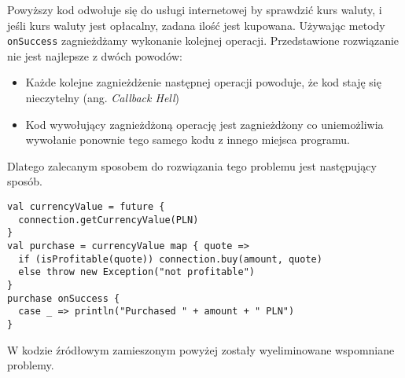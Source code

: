 Powyższy kod odwołuje się do usługi internetowej by sprawdzić kurs waluty, i jeśli kurs waluty jest opłacalny, zadana ilość jest kupowana.
Używając metody \lstinline{onSuccess} zagnieżdżamy wykonanie kolejnej operacji. Przedstawione rozwiązanie nie jest najlepsze z dwóch powodów:
\begin{itemize}
	\item Każde kolejne zagnieżdżenie następnej operacji powoduje, że kod staję się nieczytelny (ang. \emph{Callback Hell})
	\item Kod wywołujący zagnieżdżoną operację jest zagnieżdżony co uniemożliwia wywołanie ponownie tego samego kodu z innego miejsca programu.
\end{itemize}

Dlatego zalecanym sposobem do rozwiązania tego problemu jest następujący sposób.

\begin{lstlisting}
val currencyValue = future {
  connection.getCurrencyValue(PLN)
}
val purchase = currencyValue map { quote => 
  if (isProfitable(quote)) connection.buy(amount, quote)
  else throw new Exception("not profitable")
}
purchase onSuccess {
  case _ => println("Purchased " + amount + " PLN")
}
\end{lstlisting}

W kodzie źródłowym zamieszonym powyżej zostały wyeliminowane wspomniane problemy. 
